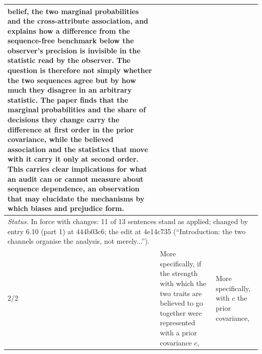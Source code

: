 \documentclass[10pt]{article}
\theoremstyle{definition}
\newlength{\fullw}\setlength{\fullw}{25.9cm}
\begin{document}
{\begin{longtable}{|p{0.9cm}|p{12.2cm}|p{12.2cm}|}
belief, the two marginal probabilities and the cross-attribute association, and explains how a difference from the sequence-free benchmark below the observer's precision is invisible in the statistic read by the observer. The question is therefore not simply whether the two sequences agree but by how much they disagree in an arbitrary statistic. The paper finds that the marginal probabilities and the share of decisions they change carry the difference at first order in the prior covariance, while the believed association and the statistics that move with it carry it only at second order. This carries clear implications for what an audit can or cannot measure about sequence dependence, an observation that may elucidate the mechanisms by which biases and prejudice form. \\ \hline
\multicolumn{3}{|p{\fullw}|}{\textit{Status.} In force with changes: 11 of 13 sentences stand as applied; changed by entry 6.10 (part 1) at 444b03c6; the edit at 4e14c735 (``Introduction: the two channels organise the analysis, not merely...'').} \\ \hline
2/2 & More specifically, if the strength with which the two traits are believed to go together were represented with a prior covariance $c$, & More specifically, with $c$ the prior covariance, \\ \hline

\end{longtable}}
\end{document}
